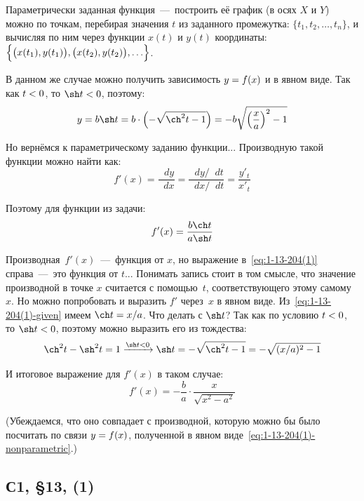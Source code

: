 \documentclass[a4paper,12pt]{article}
\newcommand{\diff}{\mathop{}\!d\!}
\begin{document}
  \begin{solution}
    Параметрически заданная функция~---~построить её график (в осях $X$ и $Y$) можно по точкам, перебирая значения $t$ из заданного промежутка: $\{t_1, t_2, \ldots, t_n\}$, и вычисляя по ним через функции $x(t)$ и $y(t)$ координаты: $\Bigl\{\bigl(x(t_1), y(t_1)\bigr), \bigl(x(t_2), y(t_2)\bigr), \ldots\Bigr\}$.

    В данном же случае можно получить зависимость $y \hm= f(x)$ и в явном виде.
    Так как $t \hm< 0$, то $\sh t \hm< 0$, поэтому:
    \begin{equation}\label{eq:1-13-204(1)-nonparametric}
      y = b \sh t = b \cdot \left(-\sqrt{\ch^2 t - 1}\right)
        = -b \sqrt{\left(\frac{x}{a}\right)^2 - 1}
    \end{equation}

    Но вернёмся к параметрическому заданию функции...
    Производную такой функции можно найти как:
    \[
      f'(x) = \frac{\diff y}{\diff x}
        = \frac{\diff y / \!\diff t}{\diff x / \!\diff t}
        = \frac{y'_t}{x'_t}
    \]

    Поэтому для функции из задачи:
    \begin{equation}\label{eq:1-13-204(1)}
        f'(x) = \frac{b \ch t}{a \sh t}
    \end{equation}
    
    Производная~$f'(x)$~---~функция от $x$, но выражение в~\eqref{eq:1-13-204(1)} справа~---~это функция от $t$...
    Понимать запись стоит в том смысле, что значение производной в точке $x$ считается с помощью~$t$, соответствующего этому самому~$x$.
    Но можно попробовать и выразить $f'$ через~$x$ в явном виде.
    Из~\eqref{eq:1-13-204(1)-given} имеем $\ch t \hm= x \hm/ a$.
    Что делать с $\sh t$?
    Так как по условию $t \hm< 0$, то $\sh t \hm< 0$, поэтому можно выразить его из тождества:
    \[
      \ch^2 t - \sh^2 t = 1 \xrightarrow{\sh t \hm< 0}
        \sh t = -\sqrt{\ch^2 t - 1} = -\sqrt{(x / a)^2 - 1}
    \]

    И итоговое выражение для $f'(x)$ в таком случае:
    \[
      f'(x) = -\frac{b}{a} \cdot \frac{x}{\sqrt{x^2 - a^2}}
    \]

    (Убеждаемся, что оно совпадает с производной, которую можно бы было посчитать по связи $y \hm= f(x)$, полученной в явном виде~\eqref{eq:1-13-204(1)-nonparametric}.)
  \end{solution}

  
  \subsection{С1, \S 13, (1)}
\end{document}
